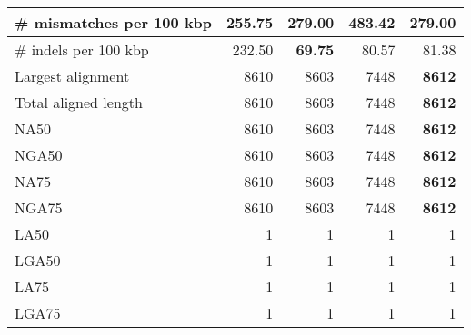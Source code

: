 \documentclass[12pt,a4paper]{article}
\begin{document}
\begin{table}[ht]
\begin{center}
\begin{tabular}{|l*{4}{|r}|}
\# mismatches per 100 kbp & {\bf 255.75} & 279.00 & 483.42 & 279.00 \\ \hline
\# indels per 100 kbp & 232.50 & {\bf 69.75} & 80.57 & 81.38 \\ \hline
Largest alignment & 8610 & 8603 & 7448 & {\bf 8612} \\ \hline
Total aligned length & 8610 & 8603 & 7448 & {\bf 8612} \\ \hline
NA50 & 8610 & 8603 & 7448 & {\bf 8612} \\ \hline
NGA50 & 8610 & 8603 & 7448 & {\bf 8612} \\ \hline
NA75 & 8610 & 8603 & 7448 & {\bf 8612} \\ \hline
NGA75 & 8610 & 8603 & 7448 & {\bf 8612} \\ \hline
LA50 & 1 & 1 & 1 & 1 \\ \hline
LGA50 & 1 & 1 & 1 & 1 \\ \hline
LA75 & 1 & 1 & 1 & 1 \\ \hline
LGA75 & 1 & 1 & 1 & 1 \\ \hline
\end{tabular}
\end{center}
\end{table}
\end{document}
